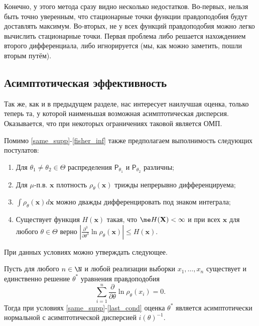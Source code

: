 Конечно, у этого метода сразу видно несколько недостатков. Во-первых, нельзя быть точно уверенным, что стационарные точки функции правдоподобия будут доставлять максимум. Во-вторых, не у всех функций правдоподобия можно легко вычислить стационарные точки. Первая проблема либо решается нахождением второго дифференциала, либо игнорируется (мы, как можно заметить, пошли вторым путём).

\subsection{Асимптотическая эффективность}\label{asympt_var}

Так же, как и в предыдущем разделе, нас интересует наилучшая оценка, только теперь та, у которой наименьшая возможная асимптотическая дисперсия. Оказывается, что при некоторых ограничениях таковой является ОМП.
\begin{strongregularity*}{}{
	Помимо \ref{same_supp}-\ref{fisher_inf} также предполагаем выполнимость следующих постулатов:
}
\begin{enumerate}[label=C\theenumi]
    \addtocounter{enumi}{4}
    \item Для $\theta_1 \ne \theta_2 \in \Theta$ распределения $\mathsf{P}_{\theta_1}$ и $\mathsf{P}_{\theta_2}$ различны;\\
    \item Для $\mu$-п.в. $\mathbf{x}$ плотность $\rho_{\theta}(\mathbf{x})$ трижды непрерывно дифференцируема;\\
    \item $\int \rho_{\theta}(\mathbf{x}) d\mathbf{x}$ можно дважды дифференцировать под знаком интеграла;\\
    \item\label{last_cond} Существует функция $H(\mathbf{x})$ такая, что $\me H(\mathbf X) < \infty$ и при всех $\mathbf{x}$ для любого $\theta \in \Theta$ верно $\left|\frac{\partial^3}{\partial \theta^3} \ln{\rho_{\theta}(\mathbf{x})}\right| \le H(\mathbf{x})$.
\end{enumerate}
\end{strongregularity*}

При данных условиях можно утверждать следующее.

\begin{theorem}{}{}
    Пусть для любого $n \in \N$ и любой реализации выборки $x_1, \ldots, x_n$ существует и единственно решение $\theta^*$ уравнения правдоподобия
    \[
    \sum_{i=1}^n \frac{\partial}{\partial \theta} \ln{\rho_{\theta}(x_i)} = 0.
    \]
    Тогда при условиях \ref{same_supp}-\ref{last_cond} оценка $\theta^*$ является асимптотически нормальной с асимптотической дисперсией $i(\theta)^{-1}$.
\end{theorem}

